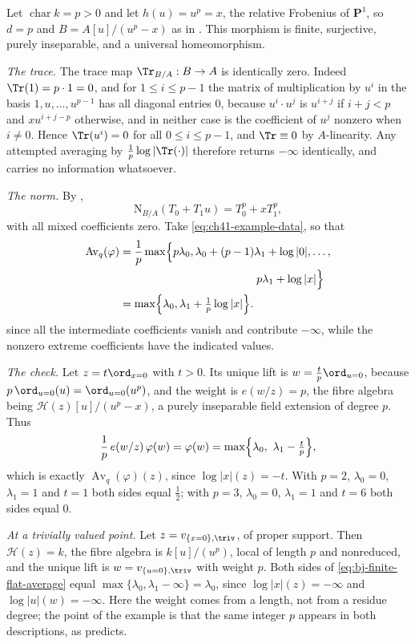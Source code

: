 \begin{example}
\label{ex:ch41-frobenius-average}
Let $\operatorname{char}k=p>0$ and let $h(u)=u^p=x$, the relative
Frobenius of $\mathbf P^1$, so $d=p$ and $B=A[u]/(u^p-x)$ as in
.  This morphism is finite, surjective,
purely inseparable, and a universal homeomorphism.

\emph{The trace.}  The trace map $\Tr_{B/A}:B\to A$ is identically zero.
Indeed $\Tr(1)=p\cdot1=0$, and for $1\le i\le p-1$ the matrix of
multiplication by $u^i$ in the basis $1,u,\dots,u^{p-1}$ has all
diagonal entries $0$, because $u^i\cdot u^j$ is $u^{i+j}$ if
$i+j<p$ and $xu^{i+j-p}$ otherwise, and in neither case is the
coefficient of $u^j$ nonzero when $i\ne0$.  Hence
$\Tr(u^i)=0$ for all $0\le i\le p-1$, and $\Tr\equiv0$ by
$A$-linearity.  Any attempted averaging by
$\frac1p\log|\Tr(\cdot)|$ therefore returns $-\infty$ identically, and
carries no information whatsoever.

\emph{The norm.}  By ,
\[
 \mathrm N_{B/A}(T_0+T_1u)=T_0^p+xT_1^p ,
\]
with all mixed coefficients zero.  Take \eqref{eq:ch41-example-data}, so
that
\[
 \begin{aligned}
 \operatorname{Av}_q(\varphi)
 &=\frac1p\max\Bigl\{
     p\lambda_0,
     \lambda_0+(p-1)\lambda_1+\log|0|,
     \dots,\\
 &\hspace{43mm}p\lambda_1+\log|x|
   \Bigr\}\\
 &=\max\Bigl\{\lambda_0,
     \lambda_1+\tfrac1p\log|x|\Bigr\}.
 \end{aligned}
\]
since all the intermediate coefficients vanish and contribute
$-\infty$, while the nonzero extreme coefficients have the indicated values.

\emph{The check.}  Let $z=t\ord_{x=0}$ with $t>0$.  Its unique lift is
$w=\frac tp\ord_{u=0}$, because $p\,\ord_{u=0}(u)=\ord_{u=0}(u^p)$, and
the weight is $e(w/z)=p$, the fibre algebra being
$\mathcal H(z)[u]/(u^p-x)$, a purely inseparable field extension of
degree $p$.  Thus
\[
 \frac1p\,e(w/z)\,\varphi(w)
 =\varphi(w)
 =\max\Bigl\{\lambda_0,\ \lambda_1-\tfrac tp\Bigr\},
\]
which is exactly $\operatorname{Av}_q(\varphi)(z)$, since
$\log|x|(z)=-t$.  With $p=2$, $\lambda_0=0$, $\lambda_1=1$ and
$t=1$ both sides equal $\tfrac12$; with $p=3$, $\lambda_0=0$,
$\lambda_1=1$ and $t=6$ both sides equal $0$.

\emph{At a trivially valued point.}  Let $z=v_{\{x=0\},\triv}$, of proper
support.  Then $\mathcal H(z)=k$, the fibre algebra is
$k[u]/(u^p)$, local of length $p$ and nonreduced, and the unique lift is
$w=v_{\{u=0\},\triv}$ with weight $p$.  Both sides of
\eqref{eq:bj-finite-flat-average} equal
$\max\{\lambda_0,\lambda_1-\infty\}=\lambda_0$, since
$\log|x|(z)=-\infty$ and $\log|u|(w)=-\infty$.  Here the weight comes
from a length, not from a residue degree; the point of the example is that
the same integer $p$ appears in both descriptions, as
 predicts.
\end{example}

